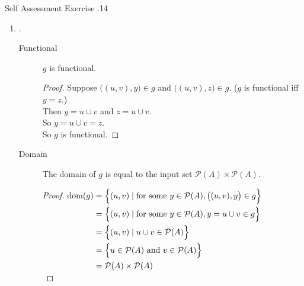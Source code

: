 \documentclass[../notes.tex]{subfiles}
\begin{document}
\begin{exercise}{Self Assessment Exercise \thechapter.14}
\begin{enumerate}
\begin{enumerate}[label=(\alph*)]
\begin{description}
											\begin{proof} $
												\begin{aligned}[t]
													\mathrm{dom}(f) &= \{x \mid \text{for some } y \in \mathcal{P}(A), (x, y) \in f\}\\
													&= \{x \mid \text{for some } y \in \mathcal{P}(A), y = x'\}\\
													&= \{x \mid x' \in \mathcal{P}(A)\}\\
													&= \mathcal{P}(A)
												\end{aligned} $\\
												Therefore $\mathrm{dom}(f)$ is equal to the input set.
											\end{proof}
									\end{description}
								\item {}.
									\begin{description}
										\item[Functional] $g$ is functional.
											\begin{proof}
												Suppose $\bigl((u, v), y\bigr) \in g$ and $\bigl((u, v), z\bigr) \in g$. ($g$ is functional iff $y = z$.)\\
												Then $y = u \cup v$ and $z = u \cup v$.\\
												So $y = u \cup v = z$.\\
												So $g$ is functional.
											\end{proof}
										\item[Domain] The domain of $g$ is equal to the input set $\mathcal{P}(A) \times \mathcal{P}(A)$.
											\begin{proof} $
												\begin{aligned}[t]
													\mathrm{dom}(g) &= \Bigl\{(u, v) \mid \text{for some } y \in \mathcal{P}(A), \bigl((u, v), y\bigr) \in g\Bigr\}\\
													&= \Bigl\{(u, v) \mid \text{for some } y \in \mathcal{P}(A), y = u \cup v \in g\Bigr\}\\
													&= \Bigl\{(u, v) \mid u \cup v \in \mathcal{P}(A)\Bigr\}\\
													&= \Bigl\{u \in \mathcal{P}(A) \text{ and } v \in \mathcal{P}(A)\Bigr\}\\
													&= \mathcal{P}(A) \times \mathcal{P}(A)
												\end{aligned} $\\

\end{proof}
\end{description}
\end{enumerate}
\end{enumerate}
\end{exercise}
\end{document}
